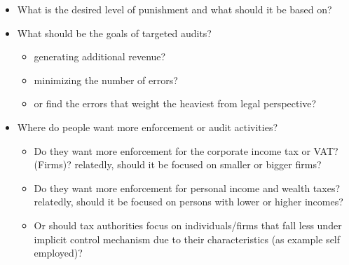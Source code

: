 \documentclass[a4paper, 12pt]{article}
\begin{document}
\begin{itemize}
    \item What is the desired level of punishment and what should it be based on?
    \item What should be the goals of targeted audits? 
    \begin{itemize}
        \item generating additional revenue?
        \item minimizing the number of errors?
        \item or find the errors that weight the heaviest from legal perspective?
    \end{itemize}
    \item Where do people want more enforcement or audit activities?
    \begin{itemize}
        \item Do they want more enforcement for the corporate income tax or VAT? (Firms)? relatedly, should it be focused on smaller or bigger firms?
        \item Do they want more enforcement for personal income and wealth taxes? relatedly, should it be focused on persons with lower or higher incomes?
        \item Or should tax authorities focus on individuals/firms that fall less under implicit control mechanism due to their characteristics (as example self employed)?
    \end{itemize}
\end{itemize}
\end{document}
